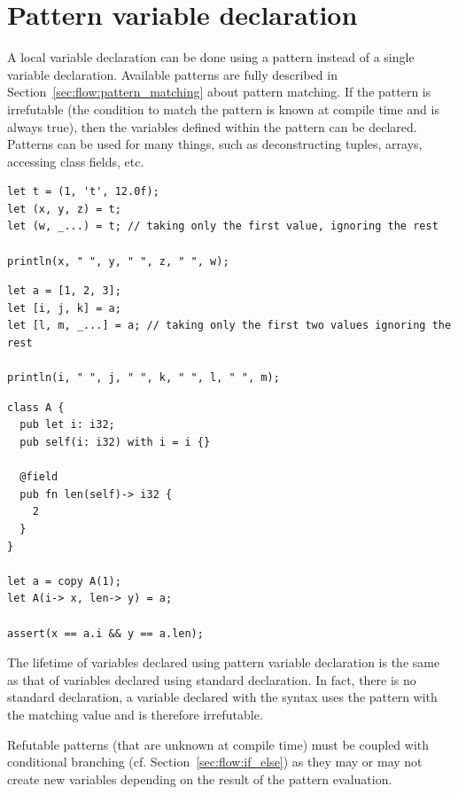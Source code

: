 \section{Pattern variable declaration}
\label{sec:memory:pattern_vdecl}

A local variable declaration can be done using a pattern instead of a single
variable declaration. Available patterns are fully described in
Section~\ref{sec:flow:pattern_matching} about pattern matching. If the pattern is
irrefutable (the condition to match the pattern is known at compile time and is
always true), then the variables defined within the pattern can be declared.
Patterns can be used for many things, such as deconstructing tuples, arrays,
accessing class fields, etc.

\begin{lstlisting}[style=coloredverbatim, escapechar=@, caption=Tuple deconstruction]
let t = (1, 't', 12.0f);
let (x, y, z) = t;
let (w, _...) = t; // taking only the first value, ignoring the rest

println(x, " ", y, " ", z, " ", w);
\end{lstlisting}

\begin{lstlisting}[style=coloredverbatim, escapechar=@, caption=Array deconstruction]
let a = [1, 2, 3];
let [i, j, k] = a;
let [l, m, _...] = a; // taking only the first two values ignoring the rest

println(i, " ", j, " ", k, " ", l, " ", m);
\end{lstlisting}

\begin{lstlisting}[style=coloredverbatim, caption=Class field access]
class A {
  pub let i: i32;
  pub self(i: i32) with i = i {}

  @field
  pub fn len(self)-> i32 {
    2
  }
}

let a = copy A(1);
let A(i-> x, len-> y) = a;

assert(x == a.i && y == a.len);
\end{lstlisting}

The lifetime of variables declared using pattern variable declaration is the
same as that of variables declared using standard declaration. In fact, there is
no standard declaration, a variable declared with the syntax  uses the pattern  with the matching value 
and is therefore irrefutable.

Refutable patterns (that are unknown at compile time) must be coupled with
conditional branching (cf. Section~\ref{sec:flow:if_else}) as they may or may not
create new variables depending on the result of the pattern evaluation.

